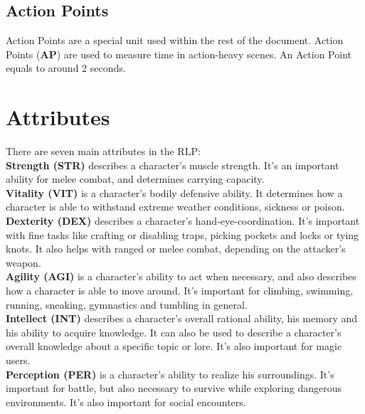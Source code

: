 \subsection{Action Points}\label{subsec:actionPoints}
Action Points are a special unit used within the rest of the document.
Action Points (\textbf{AP}) are used to measure time in action-heavy scenes.
An Action Point equals to around 2 seconds.

\section{Attributes}\label{sec:stats}
There are seven main attributes in the RLP:\\

\textbf{Strength (STR)}\label{stat:strength} describes a character's muscle strength.
It's an important ability for melee combat, and determines carrying capacity.\\


\textbf{Vitality (VIT)}\label{stat:vitality} is a character's bodily defensive ability.
It determines how a character is able to withstand extreme weather conditions, sickness or poison.\\


\textbf{Dexterity (DEX)}\label{stat:dexterity} describes a character's hand-eye-coordination.
It's important with fine tasks like crafting or disabling traps, picking pockets and locks or tying knots.
It also helps with ranged or melee combat, depending on the attacker's weapon.\\


\textbf{Agility (AGI)}\label{stat:agility} is a character's ability to act when necessary, and also describes how a character is able to move around.
It's important for climbing, swimming, running, sneaking, gymnastics and tumbling in general.\\


\textbf{Intellect (INT)}\label{stat:intellect} describes a character's overall rational ability, his memory and his ability to acquire knowledge.
It can also be used to describe a character's overall knowledge about a specific topic or lore.
It's also important for magic users.\\


\textbf{Perception (PER)}\label{stat:perception} is a character's ability to realize his surroundings.
It's important for battle, but also necessary to survive while exploring dangerous environments.
It's also important for social encounters.\\


